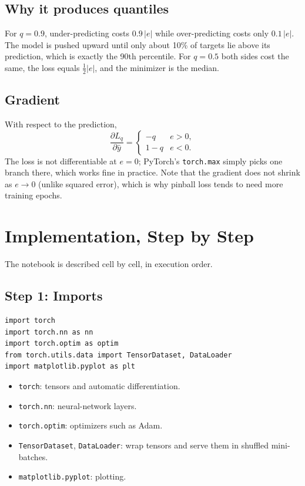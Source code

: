 \documentclass[11pt]{article}
\begin{document}
\subsection{Why it produces quantiles}

For $q = 0.9$, under-predicting costs $0.9\,|e|$ while over-predicting costs
only $0.1\,|e|$. The model is pushed upward until only about 10\% of targets
lie above its prediction, which is exactly the 90th percentile. For $q = 0.5$
both sides cost the same, the loss equals $\tfrac12|e|$, and the minimizer is
the median.

\subsection{Gradient}

With respect to the prediction,
\[
  \frac{\partial L_q}{\partial \hat y} =
  \begin{cases}
    -q    & e > 0, \\
    1 - q & e < 0.
  \end{cases}
\]
The loss is not differentiable at $e = 0$; PyTorch's \texttt{torch.max} simply
picks one branch there, which works fine in practice. Note that the gradient
does not shrink as $e \to 0$ (unlike squared error), which is why pinball loss
tends to need more training epochs.

\section{Implementation, Step by Step}

The notebook is described cell by cell, in execution order.

\subsection{Step 1: Imports}

\begin{lstlisting}
import torch
import torch.nn as nn
import torch.optim as optim
from torch.utils.data import TensorDataset, DataLoader
import matplotlib.pyplot as plt
\end{lstlisting}

\begin{itemize}
  \item \texttt{torch}: tensors and automatic differentiation.
  \item \texttt{torch.nn}: neural-network layers.
  \item \texttt{torch.optim}: optimizers such as Adam.
  \item \texttt{TensorDataset}, \texttt{DataLoader}: wrap tensors and serve them in shuffled mini-batches.
  \item \texttt{matplotlib.pyplot}: plotting.
\end{itemize}
\end{document}
